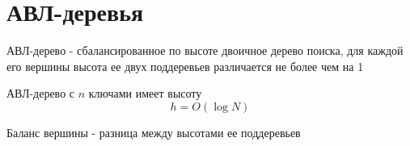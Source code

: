 \documentclass[discrete.tex]{subfiles}
\begin{document}
\section{АВЛ-деревья}

\begin{definition}
    АВЛ-дерево - сбалансированное по высоте двоичное дерево поиска, для каждой его вершины
    высота ее двух поддеревьев различается не более чем на 1
\end{definition}

\begin{theorem}
    АВЛ-дерево с $n$ ключами имеет высоту
    \[h = O(\log N)\]
\end{theorem}

\begin{definition}
    Баланс вершины - разница между высотами ее поддеревьев
\end{definition}
\end{document}
